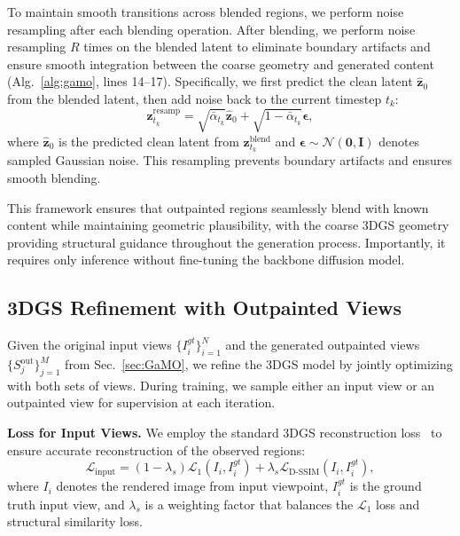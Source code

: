 \documentclass[runningheads]{llncs}
\begin{document}
To maintain smooth transitions across blended regions, we perform noise resampling after each blending operation. After blending, we perform noise resampling $R$ times on the blended latent to eliminate boundary artifacts and ensure smooth integration between the coarse geometry and generated content (Alg.~\ref{alg:gamo}, lines 14–17). Specifically, we first predict the clean latent $\hat{\mathbf{z}}_0$ from the blended latent, then add noise back to the current timestep $t_k$:
\begin{equation}
\mathbf{z}^{\text{resamp}}_{t_k} = \sqrt{\bar{\alpha}_{t_k}} \hat{\mathbf{z}}_0 + \sqrt{1 - \bar{\alpha}_{t_k}} \boldsymbol{\epsilon},
\label{eq:resamp}
\end{equation}
where $\hat{\mathbf{z}}_0$ is the predicted clean latent from $\mathbf{z}^{\text{blend}}_{t_k}$ and $\boldsymbol{\epsilon} \sim \mathcal{N}(\mathbf{0}, \mathbf{I})$ denotes sampled Gaussian noise. This resampling prevents boundary artifacts and ensures smooth blending.

This framework ensures that outpainted regions seamlessly blend with known content while maintaining geometric plausibility, with the coarse 3DGS geometry providing structural guidance throughout the generation process. Importantly, it requires only inference without fine-tuning the backbone diffusion model.


\subsection{3DGS Refinement with Outpainted Views} \label{sec:Refine}
Given the original input views $\{I_i^{gt}\}_{i=1}^N$ and the generated outpainted views $\{S_j^{\text{out}}\}_{j=1}^M$ from Sec.~\ref{sec:GaMO}, we refine the 3DGS model by jointly optimizing with both sets of views. During training, we sample either an input view or an outpainted view for supervision at each iteration. 

\noindent\textbf{Loss for Input Views.}
We employ the standard 3DGS reconstruction loss~\cite{kerbl20233d} to ensure accurate reconstruction of the observed regions:
\begin{equation}
\mathcal{L}_{\text{input}} = (1-\lambda_s)\mathcal{L}_1(I_i, I^{gt}_i) + \lambda_s\mathcal{L}_{\text{D-SSIM}}(I_i, I^{gt}_i),
\label{eq:loss_input}
\end{equation}
where $I_i$ denotes the rendered image from input viewpoint, $I^{gt}_i$ is the ground truth input view, and $\lambda_s$ is a weighting factor that balances the $\mathcal{L}_1$ loss and structural similarity loss.
\end{document}
